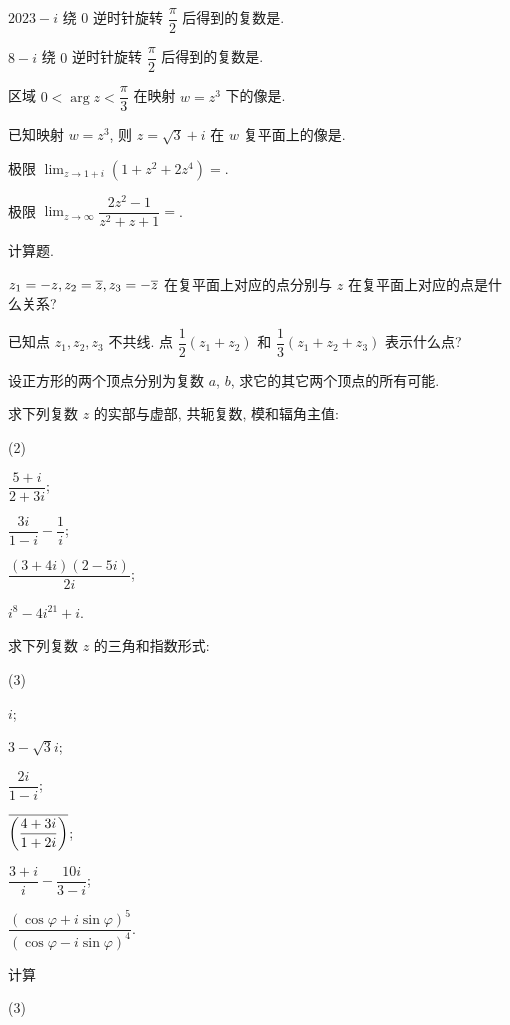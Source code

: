 \begin{homework}
\begin{subex}
    \item $2023-i$ 绕 $0$ 逆时针旋转 $\dfrac\pi2$ 后得到的复数是\fillblank{}.
    \item $8-i$ 绕 $0$ 逆时针旋转 $\dfrac\pi2$ 后得到的复数是\fillblank{}.
    \item 区域 $0<\arg z<\dfrac\pi3$ 在映射 $w=z^3$ 下的像是\fillblank[12em]{}.
    \item 已知映射 $w=z^3$, 则 $z=\sqrt3+i$ 在 $w$ 复平面上的像是\fillblank{}.
    \item 极限 $\displaystyle\lim_{z\to1+i}(1+z^2+2z^4)=$\fillblank{}.
    \item 极限 $\displaystyle\lim_{z\to\infty}\dfrac{2z^2-1}{z^2+z+1}=$\fillblank{}.
  \end{subex}
  \item 计算题.
  \begin{subex}
    \item $z_1=-z,z_2=\overline z,z_3=-\overline{z}$ 在复平面上对应的点分别与 $z$ 在复平面上对应的点是什么关系?
    \item 已知点 $z_1,z_2,z_3$ 不共线. 点 $\dfrac12(z_1+z_2)$ 和 $\dfrac13(z_1+z_2+z_3)$ 表示什么点?
    \item 设正方形的两个顶点分别为复数 $a$, $b$, 求它的其它两个顶点的所有可能.
    \item 求下列复数 $z$ 的实部与虚部, 共轭复数, 模和辐角主值:
    \begin{subsubex}(2)
      \item $\dfrac{5+i}{2+3i}$;
      \item $\dfrac{3i}{1-i}-\dfrac1i$;
      \item $\dfrac{(3+4i)(2-5i)}{2i}$;
      \item $i^8-4i^{21}+i$.
    \end{subsubex}
    \item 求下列复数 $z$ 的三角和指数形式:
    \begin{subsubex}(3)
      \item $i$;
      \item $3-\sqrt 3i$;
      \item $\dfrac{2i}{1-i}$;
      \item $\overline{\biggl(\dfrac{4+3i}{1+2i}\biggr)}$;
      \item $\dfrac{3+i}{i}-\dfrac{10i}{3-i}$;
      \item $\dfrac{(\cos \varphi+i\sin \varphi)^5}{(\cos \varphi-i\sin \varphi)^4}$.
    \end{subsubex}
    \item 计算
    \begin{subsubex}(3)

\end{subsubex}
\end{subex}
\end{homework}
